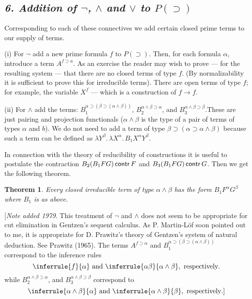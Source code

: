 \documentclass[12pt]{article}
\def\imp{\rightarrow}
\def\l{\lambda}
\def\limp{\supset}
\def\PI{P(\limp)}
\def\a{\alpha}
\def\b{\beta}
\newtheorem{theorem}{Theorem}
\begin{document}
\def\fimpa{f \limp a}
\def\contr{\mathop{\sf contr}}

\subsection{\it 6. Addition of $\lnot$, $\land$ and $\lor$ to $\PI$}

Corresponding to each of these connectives we add certain closed prime terms to our supply of terms.

\medskip
\noindent
(i) For $\lnot$ add a new prime formula $f$ to $\PI$. Then, for each formula $\a$, introduce a term
$A^{\fimpa}$. As an exercise the reader may wish to prove --- for the resulting system ---
that there are no closed terms of type $f$. (By normalizability it is sufficient to prove this for irreducible terms). 
There are open terms of type $f$; for example, the variable $X^f$ — which is a construction of $f \imp f$.

\medskip
\noindent
(ii) For $\land$ add the terms: $B_1^{\a \limp (\b \limp (\a \land \b))}$, $B_2^{\a \land \b \limp \a}$, and $B_3^{\a \land \b \limp \b}$.These are just pairing and projection functionals ($\a \land \b$ is the type of a pair of
terms of types $\a$ and $b$). We do not need to add a term of type $\b \limp (\a \limp \a \land \b)$
because such a term can be defined as $\l Y^\b . \, \l X ^\a . \, B_1 X^\a Y^\b$.

In connection with the theory of reducibility of constructions it is useful to postulate the contraction
$B_2(B_1 FG) \contr F $ and $B_3(B_1 FG) \contr G$.
Then we get the following theorem.

\begin{theorem}
Every closed irreducible term of type $\a \land \b$ has the form $B_1 F^\a G^\b $ where $B_1$ is as above.
\end{theorem}
[{\it Note added 1979}. This treatment of $\lnot$ and $\land$ does not seem to be appropriate for cut elimination in Gentzen's sequent calculus. 
As P. Martin-Löf soon pointed out to me, it is appropriate for D. Prawitz's theory of Gentzen's system of natural deduction.
See Prawitz (1965). The terms $A^{f \limp \a}$ and $B_1^{\a \limp (\b \limp (\a \land \b))}$ correspond
to the inference rules
$$
\inferrule{f}{\a} \text{ and } \inferrule{\a \b}{\a \land \b}, \text{ respectively}.
$$
while $B_2^{\a \land \b \limp \a}$, and $B_3^{\a \land \b \limp \b}$ correspond to
$$
\inferrule{\a \land \b}{\a} \text{ and } \inferrule{\a \land \b}{\b}, \text{ respectively}. ]
$$
\end{document}
